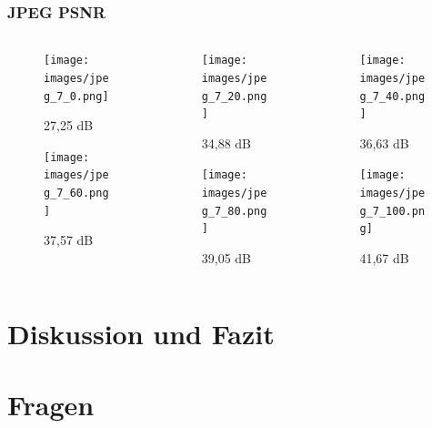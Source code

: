 \documentclass[xcolor=dvipsnames]{beamer}
\begin{document}
\begin{frame}
	\frametitle{JPEG PSNR}
	\begin{columns}
		\begin{column}{3cm}
			\begin{figure}
				\texttt{[image: images/jpeg\_7\_0.png]}
				\caption{27,25 dB}
			\end{figure}
			\begin{figure}
				\texttt{[image: images/jpeg\_7\_60.png]}
				\caption{37,57 dB}
			\end{figure}
		\end{column}
		\begin{column}{3cm}
			\begin{figure}
				\texttt{[image: images/jpeg\_7\_20.png]}
				\caption{34,88 dB}
			\end{figure}
			\begin{figure}
				\texttt{[image: images/jpeg\_7\_80.png]}
				\caption{39,05 dB}
			\end{figure}
		\end{column}
		\begin{column}{3cm}
			\begin{figure}
				\texttt{[image: images/jpeg\_7\_40.png]}
				\caption{36,63 dB}
			\end{figure}
			\begin{figure}
				\texttt{[image: images/jpeg\_7\_100.png]}
				\caption{41,67 dB}
			\end{figure}
		\end{column}
	\end{columns}
\end{frame}

\section{Diskussion und Fazit}
\section{Fragen}

{\tiny}
\end{document}
